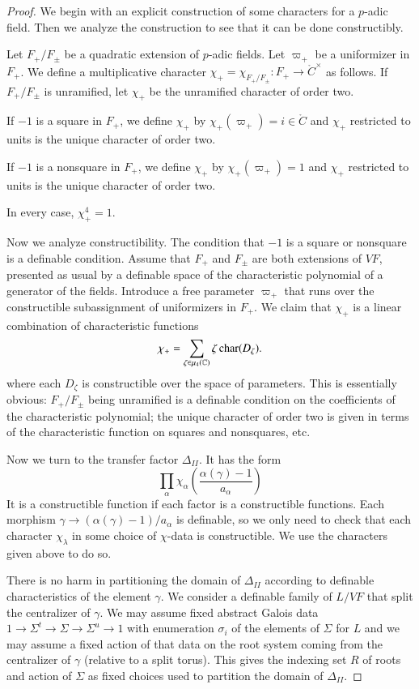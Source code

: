 \begin{proof}  We begin with an explicit construction of some characters for a $p$-adic field.  Then we analyze the construction to
see that it can be done constructibly.

Let $F_+/F_\pm$ be a quadratic extension of $p$-adic fields.  Let $\varpi_+$ be a uniformizer in $F_+$.  We define a multiplicative character $\chi_+ = \chi_{F_+/F_{\pm}}:F_+\to \ring{C}^\times$
as follows.  If $F_+/F_\pm$ is unramified, let $\chi_+$ be the unramified character of order two.

If $-1$ is a square in $F_+$, we define $\chi_+$ by $\chi_+(\varpi_+) = i\in\ring{C}$ and $\chi_+$ restricted to units is the unique character of order two.

If $-1$ is a nonsquare in $F_+$, we define $\chi_+$ by $\chi_+(\varpi_+)=1$ and $\chi_+$ restricted to units is the unique character of order two.

In every case, $\chi_+^4 = 1$.  

Now we analyze  constructibility.  The condition that $-1$ is a square or nonsquare is a definable condition.
Assume that $F_+$ and $F_\pm$ are both extensions of $VF$, presented as usual by a definable space of the characteristic polynomial of a generator of the fields.  
Introduce a free parameter $\varpi_+$ that runs over the constructible subassignment of uniformizers in $F_+$.
We claim that $\chi_+$ is a linear combination of characteristic functions
\[
\chi_+ = \sum_{\zeta\in\mu_4(\mathbb{C})} \zeta\, {\operatorname{char}}(D_\zeta).
\]
where each $D_\zeta$ is constructible over the space of parameters.  
This is essentially obvious: $F_+/F_\pm$ being unramified is a definable condition on the coefficients of the characteristic polynomial;
the unique character of order two is given in terms of the characteristic function  on squares and nonsquares, etc.

Now we turn to the transfer factor $\Delta_{II}$.  It has the form
\[
\prod_\alpha \chi_\alpha\left(\frac{\alpha(\gamma)-1}{a_\alpha}\right)
\]
It is a constructible function if each factor is a constructible functions. Each morphism $\gamma\to(\alpha(\gamma)-1)/a_\alpha$ is
definable, so we only need to check that each character $\chi_\lambda$ in some choice of $\chi$-data is constructible.  We use the characters
given above to do so.

There is no harm in partitioning the domain of $\Delta_{II}$   according to definable characteristics of the element $\gamma$.  We consider a definable family of
 $L/VF$ that split the centralizer of $\gamma$.  We may assume fixed abstract Galois data $1\to\Sigma^t\to\Sigma\to \Sigma^u\to 1$ with
enumeration $\sigma_i$ of the elements of $\Sigma$ for $L$
and we may assume a fixed action of that data on the root system coming from the centralizer of $\gamma$ (relative to a split torus).   This gives the
indexing set $R$ of roots and action of $\Sigma$ as fixed choices used to partition the domain of $\Delta_{II}$.


\end{proof}
